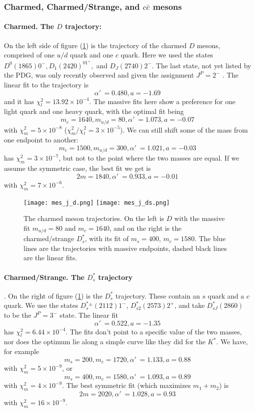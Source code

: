 \documentclass[11pt,a4]{article}
\newcommand{\alp}{\ensuremath{\alpha'\:}}
\newcommand{\ccb}{c\bar{c}}
\newcommand{\rchi}[1]{\ensuremath{\chi^2_m/\chi^2_l = #1}}
\newcommand{\ten}[1]{\times10^{#1}}
\begin{document}
			\subsubsection{Charmed, Charmed/Strange, and \texorpdfstring{$\ccb$}{c-cbar} mesons}
				 \paragraph{Charmed. The \(D\) trajectory:} On the left side of figure (\ref{fig:d_ds}) is the trajectory of the charmed \(D\) mesons, comprised of one \(u/d\) quark and one \(c\) quark. Here we used the	states \(D^0(1865)0^-, D_1(2420)^01^+,\) and \(D_J(2740)2^-\). The last state, not yet listed by the PDG, was only recently observed and given the assignment \(J^P = 2^-\) \cite{Aaij:2013sza}\cite{Wang:2013tka}.
			The linear fit to the trajectory is
			\[ \alp = 0.480, a = -1.69 \]
			and it has \(\chi^2_l = 13.92\ten{-4}\). The massive fits here show a preference for one light quark and one heavy quark, with the optimal fit being
			\[ m_c = 1640, m_{u/d} = 80, \alp = 1.073, a = -0.07 \]
			with \(\chi^2_m = 5\ten{-8}\) (\rchi{3\ten{-5}}). We can still shift some of the mass from one endpoint to another:
			\[ m_c = 1500, m_{u/d} = 300, \alp = 1.021, a = -0.03\]
			has \(\chi^2_m = 3\ten{-7}\), but not to the point where the two masses are equal. If we assume the symmetric case, the best fit we get is
			\[ 2m = 1840, \alp = 0.933, a = -0.01 \]
			with \(\chi^2_m = 7\ten{-6}\).
			
			\begin{figure}[tbp] \centering
						\texttt{[image: mes\_j\_d.png]}	 \hfill
						\texttt{[image: mes\_j\_ds.png]}
						\caption{\label{fig:d_ds} The charmed meson trajectories. On the left is \(D\) with the massive fit \(m_{u/d} = 80\) and \(m_c = 1640\), and on the right is the charmed/strange \(D^*_s\), with its fit of \(m_s = 400\), \(m_c = 1580\). The blue lines are the trajectories with massive endpoints, dashed black lines are the linear fits.}
				\end{figure}
			
				\paragraph{Charmed/Strange. The \(D^*_s\) trajectory}. On the right of figure (\ref{fig:d_ds}) is the \(D^*_s\) trajectory. These contain an \(s\) quark and a \(c\) quark. We use the states \(D^*_s{}^\pm(2112)1^-\), \(D^*_{s2}(2573)2^+\), and take \(D^*_{sJ}(2860)\) to be the \(J^P = 3^-\) state. The linear fit
				\[ \alp = 0.522, a = -1.35 \]
				has \(\chi^2_l = 6.44\ten{-4}\). The fits don't point to a specific value of the two masses, nor does the optimum lie along a simple curve like they did for the \(K^*\). We have, for example
				\[ m_s = 200, m_c = 1720, \alp = 1.133, a = 0.88 \]
				with \(\chi^2_m = 5\ten{-9}\), or
				\[ m_s = 400, m_c = 1580, \alp = 1.093, a = 0.89 \]
				with \(\chi^2_m = 4\ten{-9}\). The best symmetric fit (which maximizes \(m_1 + m_2\)) is
				\[ 2m = 2020, \alp = 1.028, a = 0.93\]
				with \(\chi^2_m = 16\ten{-9}\).
				
\end{document}
